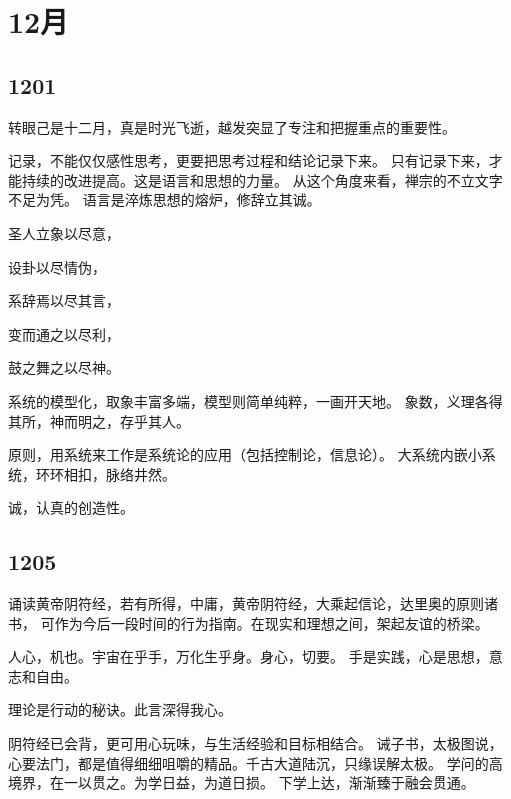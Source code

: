 
\section{12月}

\subsection{1201}

转眼己是十二月，真是时光飞逝，越发突显了专注和把握重点的重要性。

记录，不能仅仅感性思考，更要把思考过程和结论记录下来。
只有记录下来，才能持续的改进提高。这是语言和思想的力量。
从这个角度来看，禅宗的不立文字不足为凭。
语言是淬炼思想的熔炉，修辞立其诚。

\begin{shadequote}

圣人立象以尽意，

设卦以尽情伪，

系辞焉以尽其言，

变而通之以尽利，

鼓之舞之以尽神。
\end{shadequote}

系统的模型化，取象丰富多端，模型则简单纯粹，一画开天地。
象数，义理各得其所，神而明之，存乎其人。

原则，用系统来工作是系统论的应用（包括控制论，信息论）。
大系统内嵌小系统，环环相扣，脉络井然。

诚，认真的创造性。

\subsection{1205}

诵读黄帝阴符经，若有所得，中庸，黄帝阴符经，大乘起信论，达里奥的原则诸书，
可作为今后一段时间的行为指南。在现实和理想之间，架起友谊的桥梁。

人心，机也。宇宙在乎手，万化生乎身。身心，切要。
手是实践，心是思想，意志和自由。

理论是行动的秘诀。此言深得我心。

阴符经已会背，更可用心玩味，与生活经验和目标相结合。
诫子书，太极图说，心要法门，都是值得细细咀嚼的精品。千古大道陆沉，只缘误解太极。
学问的高境界，在一以贯之。为学日益，为道日损。
下学上达，渐渐臻于融会贯通。

